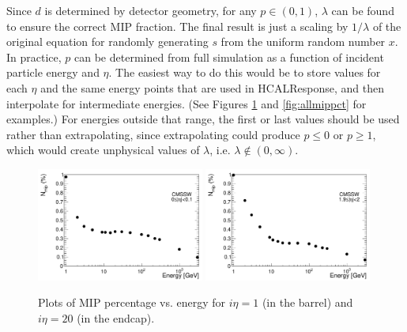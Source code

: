 Since $d$ is determined by detector geometry, for any $p \in (0,1)$, $\lambda$ can be found to ensure the correct MIP fraction. The final result is just a scaling by $1/\lambda$ of the original equation for randomly generating $s$ from the uniform random number $x$. In practice, $p$ can be determined from full simulation as a function of incident particle energy and $\eta$. The easiest way to do this would be to store values for each $\eta$ and the same energy points that are used in HCALResponse, and then interpolate for intermediate energies. (See Figures \ref{fig:mippct} and \ref{fig:allmippct} for examples.) For energies outside that range, the first or last values should be used rather than extrapolating, since extrapolating could produce $p \leq 0$ or $p \geq 1$, which would create unphysical values of $\lambda$, i.e. $\lambda \not\in (0,\infty)$.

\begin{figure}[hbtp]
\begin{center}
\includegraphics[width=0.49\textwidth]{figures/fs_plot_mip_ieta1.pdf}
\includegraphics[width=0.49\textwidth]{figures/fs_plot_mip_ieta20.pdf}
\caption{Plots of MIP percentage vs. energy for $i\eta = 1$ (in the barrel) and $i\eta = 20$ (in the endcap).}
\label{fig:mippct}
\end{center}
\end{figure}

